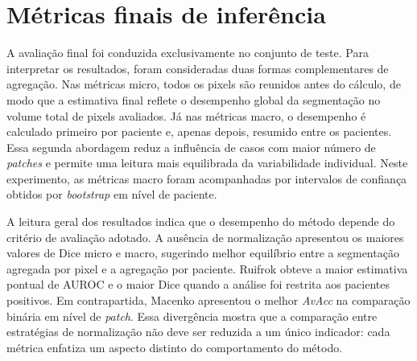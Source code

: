 \begin{table}[!htb]
\centering
\caption{Composição final do \textit{ensemble} utilizada na inferência em DIAGSET.}
\label{tab:results_diagset-ensemble-summary}
\small
{}
\end{table}

\section{Métricas finais de inferência}\label{sec:res_diagset_inferencia}

A avaliação final foi conduzida exclusivamente no conjunto de teste. Para interpretar os resultados, foram consideradas duas formas complementares de agregação. Nas métricas micro, todos os pixels são reunidos antes do cálculo, de modo que a estimativa final reflete o desempenho global da segmentação no volume total de pixels avaliados. Já nas métricas macro, o desempenho é calculado primeiro por paciente e, apenas depois, resumido entre os pacientes. Essa segunda abordagem reduz a influência de casos com maior número de \textit{patches} e permite uma leitura mais equilibrada da variabilidade individual. Neste experimento, as métricas macro foram acompanhadas por intervalos de confiança obtidos por \textit{bootstrap} em nível de paciente.

A leitura geral dos resultados indica que o desempenho do método depende do critério de avaliação adotado. A ausência de normalização apresentou os maiores valores de Dice micro e macro, sugerindo melhor equilíbrio entre a segmentação agregada por pixel e a agregação por paciente. Ruifrok obteve a maior estimativa pontual de AUROC e o maior Dice quando a análise foi restrita aos pacientes positivos. Em contrapartida, Macenko apresentou o melhor \textit{AvAcc} na comparação binária em nível de \textit{patch}. Essa divergência mostra que a comparação entre estratégias de normalização não deve ser reduzida a um único indicador: cada métrica enfatiza um aspecto distinto do comportamento do método.

